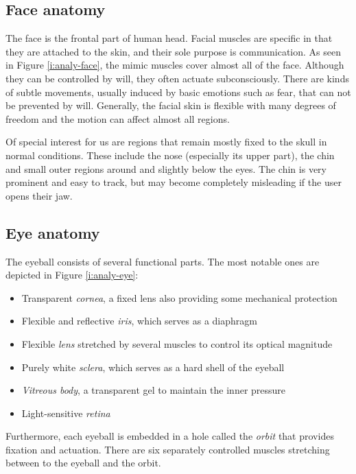 \subsection{Face anatomy}
The face is the frontal part of human head.
Facial muscles are specific in that they are attached to the skin, and their sole purpose is communication.
As seen in Figure \ref{i:analy-face}, the mimic muscles cover almost all of the face.
Although they can be controlled by will, they often actuate subconsciously.
There are kinds of subtle movements, usually induced by basic emotions such as fear, that can not be prevented by will.
Generally, the facial skin is flexible with many degrees of freedom and the motion can affect almost all regions.

Of special interest for us are regions that remain mostly fixed to the skull in normal conditions.
These include the nose (especially its upper part), the chin and small outer regions around and slightly below the eyes.
The chin is very prominent and easy to track, but may become completely misleading if the user opens their jaw.
\todo{\dots}


\subsection{Eye anatomy}
\label{s.eyeanatomy}

The eyeball consists of several functional parts.
The most notable ones are depicted in Figure \ref{i:analy-eye}:
\begin{itemize}
\item Transparent \textit{cornea}, a fixed lens also providing some mechanical protection
\item Flexible and reflective \textit{iris}, which serves as a diaphragm
\item Flexible \textit{lens} stretched by several muscles to control its optical magnitude
\item Purely white \textit{sclera}, which serves as a hard shell of the eyeball
\item \textit{Vitreous body}, a transparent gel to maintain the inner pressure
\item Light-sensitive \textit{retina}
\end{itemize}

Furthermore, each eyeball is embedded in a hole called the \textit{orbit} that provides fixation and actuation.
There are six separately controlled muscles stretching between to the eyeball and the orbit.

